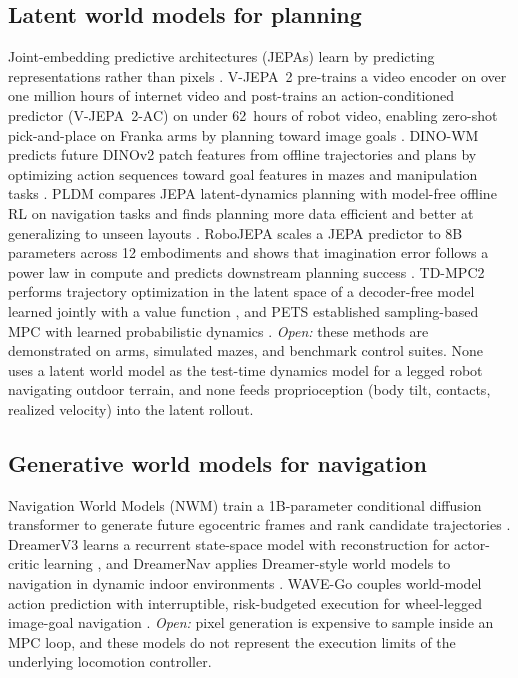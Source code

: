 \documentclass[conference]{IEEEtran}
\begin{document}
\subsection{Latent world models for planning}
Joint-embedding predictive architectures (JEPAs) learn by predicting
representations rather than pixels \cite{lecun2022path,assran2023ijepa}.
V-JEPA~2 pre-trains a video encoder on over one million hours of
internet video and post-trains an action-conditioned predictor
(V-JEPA~2-AC) on under 62~hours of robot video, enabling zero-shot
pick-and-place on Franka arms by planning toward image goals
\cite{assran2025vjepa2}. DINO-WM predicts future DINOv2 patch features
from offline trajectories and plans by optimizing action sequences
toward goal features in mazes and manipulation tasks
\cite{zhou2024dinowm}. PLDM compares JEPA latent-dynamics planning with
model-free offline RL on navigation tasks and finds planning more data
efficient and better at generalizing to unseen layouts
\cite{sobal2025pldm}. RoboJEPA scales a JEPA predictor to 8B parameters
across 12 embodiments and shows that imagination error follows a power
law in compute and predicts downstream planning success
\cite{zholus2026robojepa}. TD-MPC2 performs trajectory optimization in
the latent space of a decoder-free model learned jointly with a value
function \cite{hansen2024tdmpc2}, and PETS established sampling-based
MPC with learned probabilistic dynamics \cite{chua2018pets}.
\emph{Open:} these methods are demonstrated on arms, simulated mazes,
and benchmark control suites. None uses a latent world model as the
test-time dynamics model for a legged robot navigating outdoor terrain,
and none feeds proprioception (body tilt, contacts, realized velocity)
into the latent rollout.

\subsection{Generative world models for navigation}
Navigation World Models (NWM) train a 1B-parameter conditional diffusion
transformer to generate future egocentric frames and rank candidate
trajectories \cite{bar2025nwm}. DreamerV3 learns a recurrent
state-space model with reconstruction for actor-critic learning
\cite{hafner2023dreamerv3}, and DreamerNav applies Dreamer-style world
models to navigation in dynamic indoor environments
\cite{shanks2025dreamernav}. WAVE-Go couples world-model action
prediction with interruptible, risk-budgeted execution for wheel-legged
image-goal navigation \cite{li2026wavego}.
\emph{Open:} pixel generation is expensive to sample inside an MPC loop,
and these models do not represent the execution limits of the
underlying locomotion controller.
\end{document}
